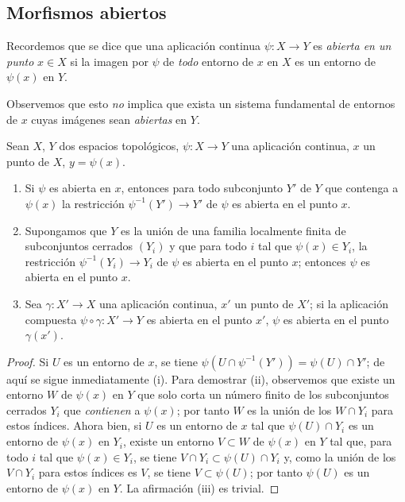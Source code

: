 \subsection{Morfismos abiertos}
\label{subsection:IV.14.1}

\begin{env}[14.1.1]
\label{IV.14.1.1}
Recordemos  que se dice que una aplicación continua $\psi:X\to Y$ es \emph{abierta en un punto} $x\in X$ si la imagen por $\psi$ de \emph{todo} entorno de $x$ en $X$ es un entorno de $\psi(x)$ en $Y$.

Observemos que esto \emph{no} implica que exista un sistema fundamental de entornos de $x$ cuyas imágenes sean \emph{abiertas} en $Y$.
\end{env}

\begin{proposition}[14.1.2]
\label{IV.14.1.2}
Sean $X$, $Y$ dos espacios topológicos, $\psi:X\to Y$ una aplicación continua, $x$ un punto de $X$, $y=\psi(x)$.
\begin{enumerate}[label=(\roman*)]
  \item Si $\psi$ es abierta en $x$, entonces para todo subconjunto $Y'$ de $Y$ que contenga a $\psi(x)$ la restricción $\psi^{-1}(Y')\to Y'$ de $\psi$ es abierta en el punto $x$.
  \item Supongamos que $Y$ es la unión de una familia localmente finita de subconjuntos cerrados $(Y_i)$ y que para todo $i$ tal que $\psi(x)\in Y_i$, la restricción $\psi^{-1}(Y_i)\to Y_i$ de $\psi$ es abierta en el punto $x$; entonces $\psi$ es abierta en el punto $x$.
  \item Sea $\gamma:X'\to X$ una aplicación continua, $x'$ un punto de $X'$; si la aplicación compuesta $\psi\circ\gamma:X'\to Y$ es abierta en el punto $x'$, $\psi$ es abierta en el punto $\gamma(x')$.
\end{enumerate}
\end{proposition}

\begin{proof}
Si $U$ es un entorno de $x$, se tiene $\psi(U\cap\psi^{-1}(Y'))=\psi(U)\cap Y'$; de aquí se sigue inmediatamente (i).
Para demostrar (ii), observemos que existe un entorno $W$ de $\psi(x)$ en $Y$ que solo corta un número finito de los subconjuntos cerrados $Y_i$ que \emph{contienen} a $\psi(x)$; por tanto $W$ es la unión de los $W\cap Y_i$ para estos índices.
Ahora bien, si $U$ es un entorno de $x$ tal que $\psi(U)\cap Y_i$ es un entorno de $\psi(x)$ en $Y_i$, existe un entorno $V\subset W$ de $\psi(x)$ en $Y$ tal que, para todo $i$ tal que $\psi(x)\in Y_i$,
se tiene $V\cap Y_i\subset\psi(U)\cap Y_i$ y, como la unión de los $V\cap Y_i$ para estos índices es $V$, se tiene $V\subset\psi(U)$; por tanto $\psi(U)$ es un entorno de $\psi(x)$ en $Y$.
La afirmación (iii) es trivial.
\end{proof}


